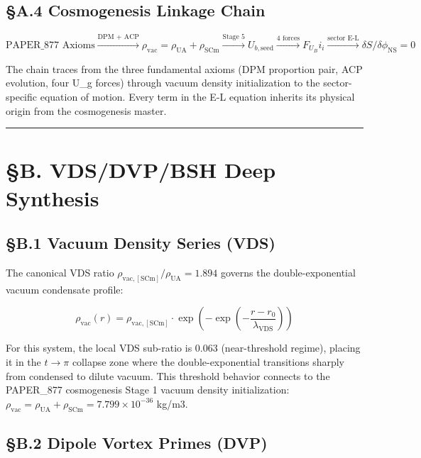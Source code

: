 \documentclass[12pt,a4paper]{article}
\begin{document}
\subsection{\S{}A.4 Cosmogenesis Linkage Chain}

\begin{equation}
\text{PAPER\_877 Axioms} \xrightarrow{\text{DPM + ACP}} \rho_{\mathrm{vac}} = \rho_{\mathrm{UA}} + \rho_{\mathrm{SCm}} \xrightarrow{\text{Stage 5}} U_{b,\mathrm{seed}} \xrightarrow{\text{4 forces}} F_U_Bi_i \xrightarrow{\text{sector E-L}} \delta S/\delta \phi_{\mathrm{NS}} = 0
\end{equation}

The chain traces from the three fundamental axioms (DPM proportion pair, ACP evolution, four U\_g forces) through vacuum density initialization to the sector-specific equation of motion. Every term in the E-L equation inherits its physical origin from the cosmogenesis master.

\medskip\hrule\medskip

\section{\S{}B. VDS/DVP/BSH Deep Synthesis}

\subsection{\S{}B.1 Vacuum Density Series (VDS)}

The canonical VDS ratio $\rho_{\mathrm{vac,[SCm]}} / \rho_{\mathrm{UA}} = 1.894$ governs the double-exponential vacuum condensate profile:

\begin{equation}
\rho_{\mathrm{vac}}(r) = \rho_{\mathrm{vac,[SCm]}} \cdot \exp\!\left(-\exp\!\left(-\frac{r - r_0}{\lambda_{\mathrm{VDS}}}\right)\right)
\end{equation}

For this system, the local VDS sub-ratio is $0.063$ (near-threshold regime), placing it in the $t \to \pi$ collapse zone where the double-exponential transitions sharply from condensed to dilute vacuum. This threshold behavior connects to the PAPER\_877 cosmogenesis Stage 1 vacuum density initialization: $\rho_{\mathrm{vac}} = \rho_{\mathrm{UA}} + \rho_{\mathrm{SCm}} = 7.799 \times 10^{-36}$ kg/m3.

\subsection{\S{}B.2 Dipole Vortex Primes (DVP)}
\end{document}

